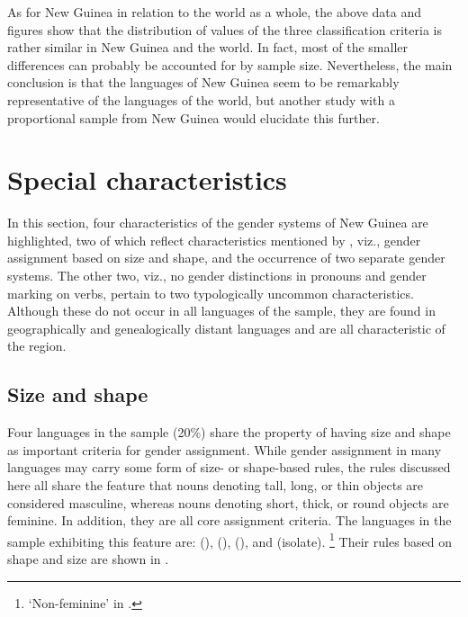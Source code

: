 \documentclass[output=collectionpaper]{langsci/langscibook}
\begin{document}
As for New Guinea in relation to the world as a whole, the above data and figures show that the distribution of values of the three classification criteria is rather similar in New Guinea and the world. In fact, most of the smaller differences can probably be accounted for by sample size. Nevertheless, the main conclusion is that the languages of New Guinea seem to be remarkably representative of the languages of the world, but another study with a proportional sample from New Guinea would elucidate this further.

\section{Special characteristics}

In this section, four characteristics of the gender systems of New Guinea are highlighted, two of which reflect characteristics mentioned by \citet{Foley2000}, viz., gender assignment based on size and shape, and the occurrence of two separate gender systems. The other two, viz., no gender distinctions in pronouns and gender marking on verbs, pertain to two typologically uncommon characteristics.  Although these do not occur in all languages of the sample, they are found in geographically and genealogically distant languages and are all characteristic of the region.

\subsection{Size and shape}
\label{sec:Svard:5.1}
Four languages in the sample (20\%) share the property of having size and shape as important criteria for gender assignment. While gender assignment in many languages may carry some form of size- or shape-based rules, the rules discussed here all share the feature that nouns denoting tall, long, or thin objects are considered masculine, whereas nouns denoting short, thick, or round objects are feminine. In addition, they are all core assignment criteria. The languages in the sample exhibiting this feature are:  (),  (),  (), and  (isolate).%
\footnote{%
`Non-feminine' in .
} %
Their rules based on shape and size are shown in .
\end{document}
